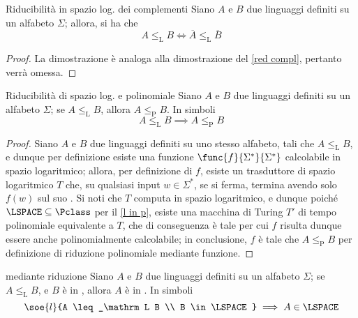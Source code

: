 \documentclass[a4paper, 12pt]{report}
\begin{document}
    \begin{framedlem}[label={l red compl}]{Riducibilità in spazio log. dei complementi}
        Siano $A$ e $B$ due linguaggi definiti su un alfabeto $\Sigma$; allora, si ha che $$A \leq_\mathrm L B \iff \overline A \leq_\mathrm L \overline B$$
    \end{framedlem}

    \begin{proof}
        La dimostrazione è analoga alla dimostrazione del \cref{red compl}, pertanto verrà omessa.
    \end{proof}

    \begin{framedlem}[label={l red into p red}]{Riducibilità di spazio log. e polinomiale}
        Siano $A$ e $B$ due linguaggi definiti su un alfabeto $\Sigma$; se $A \leq_\mathrm L B$, allora $A \leq_\mathrm P B$. In simboli $$A \leq_\mathrm L B \implies A \leq_\mathrm P B$$
    \end{framedlem}

    \begin{proof}
        Siano $A$ e $B$ due linguaggi definiti su uno stesso alfabeto, tali che $A \leq_\mathrm L B$, e dunque per definizione esiste una funzione $\func{f}{\Sigma^*}{\Sigma^*}$ calcolabile in spazio logaritmico; allora, per definizione di $f$, esiste un trasduttore di spazio logaritmico $T$ che, su qualsiasi input $w \in \Sigma^*$, se si ferma, termina avendo solo $f(w)$ sul suo . Si noti che $T$ computa in spazio logaritmico, e dunque poiché $\LSPACE \subseteq \Pclass$ per il \cref{l in p}, esiste una macchina di Turing $T'$ di tempo polinomiale equivalente a $T$, che di conseguenza è tale per cui $f$ risulta dunque essere anche polinomialmente calcolabile; in conclusione, $f$ è tale che $A \leq_\mathrm P B$ per definizione di riduzione polinomiale mediante funzione.
    \end{proof}

    \begin{framedthm}[label={l w red}]{\LSPACE mediante riduzione}
        Siano $A$ e $B$ due linguaggi definiti su un alfabeto $\Sigma$; se $A \leq_\mathrm L B$, e $B$ è in \LSPACE, allora $A$ è in \LSPACE. In simboli $$\soe{l}{A \leq_\mathrm L B \\ B \in \LSPACE} \implies A \in \LSPACE$$
    \end{framedthm}
\end{document}
